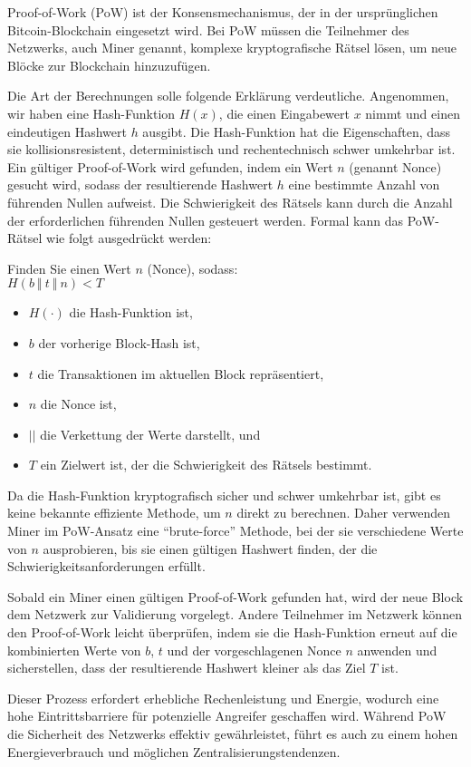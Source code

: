 Proof-of-Work (PoW) ist der Konsensmechanismus, der in der ursprünglichen Bitcoin-Blockchain eingesetzt wird. Bei PoW müssen die Teilnehmer des Netzwerks, auch Miner genannt, komplexe kryptografische Rätsel lösen, um neue Blöcke zur Blockchain hinzuzufügen. 

Die Art der Berechnungen solle folgende Erklärung verdeutliche. Angenommen, wir haben eine Hash-Funktion $H(x)$, die einen Eingabewert $x$ nimmt und einen eindeutigen Hashwert $h$ ausgibt. Die Hash-Funktion hat die Eigenschaften, dass sie kollisionsresistent, deterministisch und rechentechnisch schwer umkehrbar ist.
Ein gültiger Proof-of-Work wird gefunden, indem ein Wert $n$ (genannt Nonce) gesucht wird, sodass der resultierende Hashwert $h$ eine bestimmte Anzahl von führenden Nullen aufweist. Die Schwierigkeit des Rätsels kann durch die Anzahl der erforderlichen führenden Nullen gesteuert werden. Formal kann das PoW-Rätsel wie folgt ausgedrückt werden:

Finden Sie einen Wert $n$ (Nonce), sodass: \\
$H(b \ \Vert \ t \ \Vert \ n) < T$
\begin{itemize}
\item $H(\cdot)$ die Hash-Funktion ist,
\item $b$ der vorherige Block-Hash ist,
\item $t$ die Transaktionen im aktuellen Block repräsentiert,
\item $n$ die Nonce ist,
\item $||$ die Verkettung der Werte darstellt, und
\item $T$ ein Zielwert ist, der die Schwierigkeit des Rätsels bestimmt.
\end{itemize}
Da die Hash-Funktion kryptografisch sicher und schwer umkehrbar ist, gibt es keine bekannte effiziente Methode, um $n$ direkt zu berechnen. Daher verwenden Miner im PoW-Ansatz eine \enquote{brute-force} Methode, bei der sie verschiedene Werte von $n$ ausprobieren, bis sie einen gültigen Hashwert finden, der die Schwierigkeitsanforderungen erfüllt.

Sobald ein Miner einen gültigen Proof-of-Work gefunden hat, wird der neue Block dem Netzwerk zur Validierung vorgelegt. Andere Teilnehmer im Netzwerk können den Proof-of-Work leicht überprüfen, indem sie die Hash-Funktion erneut auf die kombinierten Werte von $b$, $t$ und der vorgeschlagenen Nonce $n$ anwenden und sicherstellen, dass der resultierende Hashwert kleiner als das Ziel $T$ ist.

Dieser Prozess erfordert erhebliche Rechenleistung und Energie, wodurch eine hohe Eintrittsbarriere für potenzielle Angreifer geschaffen wird. Während PoW die Sicherheit des Netzwerks effektiv gewährleistet, führt es auch zu einem hohen Energieverbrauch und möglichen Zentralisierungstendenzen.

